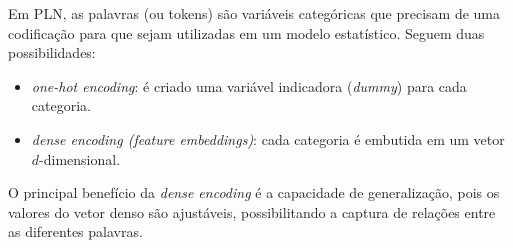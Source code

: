 \documentclass{automatextcc}
\newcommand{\bs}[1]{\boldsymbol{#1}}
\begin{document}


Em PLN, as palavras (ou tokens) são variáveis categóricas que precisam de uma codificação para que sejam utilizadas em um modelo estatístico. Seguem duas possibilidades:
\begin{itemize}
    \item \textit{one-hot encoding}: é criado uma variável indicadora (\textit{dummy}) para cada categoria.
    \item \textit{dense encoding (feature embeddings)}: cada categoria é embutida em um vetor $d$-dimensional.
\end{itemize}
O principal benefício da \textit{dense encoding} é a capacidade de generalização, pois os valores do vetor denso são ajustáveis, possibilitando a captura de relações entre as diferentes palavras.
\end{document}
